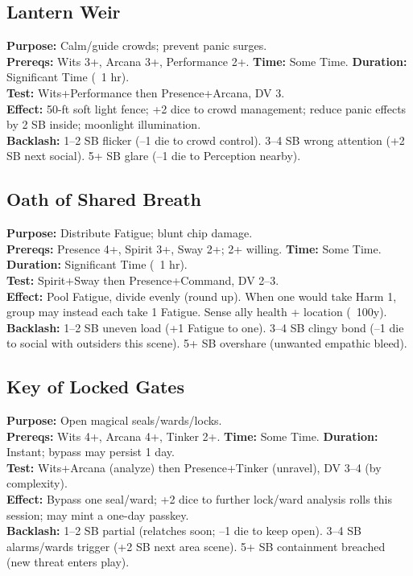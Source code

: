 \subsection*{Lantern Weir}
\textbf{Purpose:} Calm/guide crowds; prevent panic surges.\\
\textbf{Prereqs:} Wits 3+, Arcana 3+, Performance 2+. \quad \textbf{Time:} Some Time. \quad \textbf{Duration:} Significant Time (~1 hr).\\
\textbf{Test:} Wits+Performance then Presence+Arcana, DV 3.\\
\textbf{Effect:} 50-ft soft light fence; +2 dice to crowd management; reduce panic effects by 2 SB inside; moonlight illumination.\\
\textbf{Backlash:} 1--2 SB flicker (--1 die to crowd control). 3--4 SB wrong attention (+2 SB next social). 5+ SB glare (--1 die to Perception nearby).

\subsection*{Oath of Shared Breath}
\textbf{Purpose:} Distribute Fatigue; blunt chip damage.\\
\textbf{Prereqs:} Presence 4+, Spirit 3+, Sway 2+; 2+ willing. \quad \textbf{Time:} Some Time. \quad \textbf{Duration:} Significant Time (~1 hr).\\
\textbf{Test:} Spirit+Sway then Presence+Command, DV 2--3.\\
\textbf{Effect:} Pool Fatigue, divide evenly (round up). When one would take Harm 1, group may instead each take 1 Fatigue. Sense ally health + location (~100y).\\
\textbf{Backlash:} 1--2 SB uneven load (+1 Fatigue to one). 3--4 SB clingy bond (--1 die to social with outsiders this scene). 5+ SB overshare (unwanted empathic bleed).

\subsection*{Key of Locked Gates}
\textbf{Purpose:} Open magical seals/wards/locks.\\
\textbf{Prereqs:} Wits 4+, Arcana 4+, Tinker 2+. \quad \textbf{Time:} Some Time. \quad \textbf{Duration:} Instant; bypass may persist 1 day.\\
\textbf{Test:} Wits+Arcana (analyze) then Presence+Tinker (unravel), DV 3--4 (by complexity).\\
\textbf{Effect:} Bypass one seal/ward; +2 dice to further lock/ward analysis rolls this session; may mint a one-day passkey.\\
\textbf{Backlash:} 1--2 SB partial (relatches soon; --1 die to keep open). 3--4 SB alarms/wards trigger (+2 SB next area scene). 5+ SB containment breached (new threat enters play).


